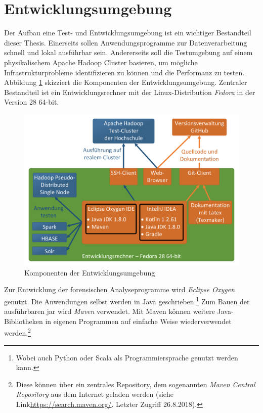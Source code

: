 \clearpage
\section{Entwicklungsumgebung}
\label{development_environment}
Der Aufbau eine Test- und Entwicklungsumgebung ist ein wichtiger Bestandteil dieser Thesis. Einerseits sollen Anwendungsprogramme zur Datenverarbeitung schnell und lokal ausführbar sein. Andererseits soll die Testumgebung auf einem physikalischem Apache Hadoop Cluster basieren, um mögliche Infrastrukturprobleme identifizieren zu können und die Performanz zu testen. \\

\noindent
Abbildung \ref{fig:development_environment} skizziert die Komponenten der Entwicklungsumgebung. Zentraler Bestandteil ist ein Entwicklungsrechner mit der Linux-Distribution \textit{Fedora} in der Version 28 64-bit.

\begin{figure}[ht]
  \centering
  \includegraphics[width=\textwidth]{./resource/development_environment.pdf}
  \caption{Komponenten der Entwicklungsumgebung}
  \label{fig:development_environment}
\end{figure} 

\noindent
Zur Entwicklung der forensischen Analyseprogramme wird \textit{Eclipse Oxygen} genutzt. Die Anwendungen selbst werden in Java geschrieben.\footnote{Wobei auch Python oder Scala als Programmiersprache genutzt werden kann.} Zum Bauen der ausführbaren \gls{jar} wird \textit{Maven} verwendet. Mit Maven können weitere Java-Bibliotheken 
in eigenen Programmen auf einfache Weise wiederverwendet werden.\footnote{Diese können über ein zentrales Repository, dem sogenannten \textit{Maven Central Repository} aus dem Internet geladen werden (siehe Link\url{https://search.maven.org/}. Letzter Zugriff 26.8.2018).}\\


